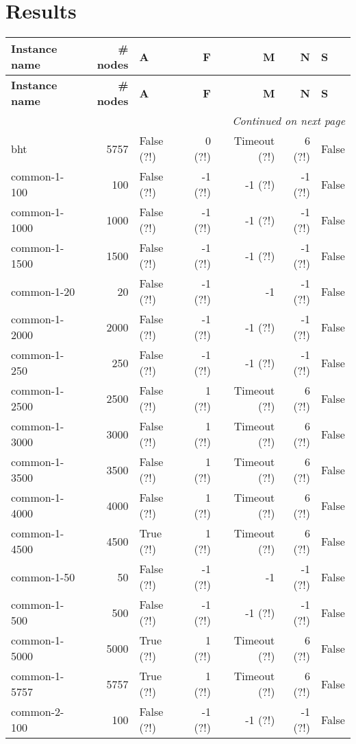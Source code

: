 \section{Results}
\begin{longtable}{lrlrrrl}\toprule \textbf{Instance name}& \textbf{\# nodes}& \textbf{A}& \textbf{F}& \textbf{M}& \textbf{N}& \textbf{S}\\
\midrule
\endfirsthead
\toprule
 \textbf{Instance name}& \textbf{\# nodes}& \textbf{A}& \textbf{F}& \textbf{M}& \textbf{N}& \textbf{S}\\
\midrule
\endhead
\midrule
\multicolumn{7}{r}{\textit{Continued on next page}} \\
\midrule
\endfoot
\bottomrule
\endlastfoot
bht & 5757 & False (?!) & 0 (?!) & Timeout (?!) & 6 (?!) & False \\
common-1-100 & 100 & False (?!) & -1 (?!) & -1 (?!) & -1 (?!) & False \\
common-1-1000 & 1000 & False (?!) & -1 (?!) & -1 (?!) & -1 (?!) & False \\
common-1-1500 & 1500 & False (?!) & -1 (?!) & -1 (?!) & -1 (?!) & False \\
common-1-20 & 20 & False (?!) & -1 (?!) & -1 & -1 (?!) & False \\
common-1-2000 & 2000 & False (?!) & -1 (?!) & -1 (?!) & -1 (?!) & False \\
common-1-250 & 250 & False (?!) & -1 (?!) & -1 (?!) & -1 (?!) & False \\
common-1-2500 & 2500 & False (?!) & 1 (?!) & Timeout (?!) & 6 (?!) & False \\
common-1-3000 & 3000 & False (?!) & 1 (?!) & Timeout (?!) & 6 (?!) & False \\
common-1-3500 & 3500 & False (?!) & 1 (?!) & Timeout (?!) & 6 (?!) & False \\
common-1-4000 & 4000 & False (?!) & 1 (?!) & Timeout (?!) & 6 (?!) & False \\
common-1-4500 & 4500 & True (?!) & 1 (?!) & Timeout (?!) & 6 (?!) & False \\
common-1-50 & 50 & False (?!) & -1 (?!) & -1 & -1 (?!) & False \\
common-1-500 & 500 & False (?!) & -1 (?!) & -1 (?!) & -1 (?!) & False \\
common-1-5000 & 5000 & True (?!) & 1 (?!) & Timeout (?!) & 6 (?!) & False \\
common-1-5757 & 5757 & True (?!) & 1 (?!) & Timeout (?!) & 6 (?!) & False \\
common-2-100 & 100 & False (?!) & -1 (?!) & -1 (?!) & -1 (?!) & False \\

\end{longtable}
